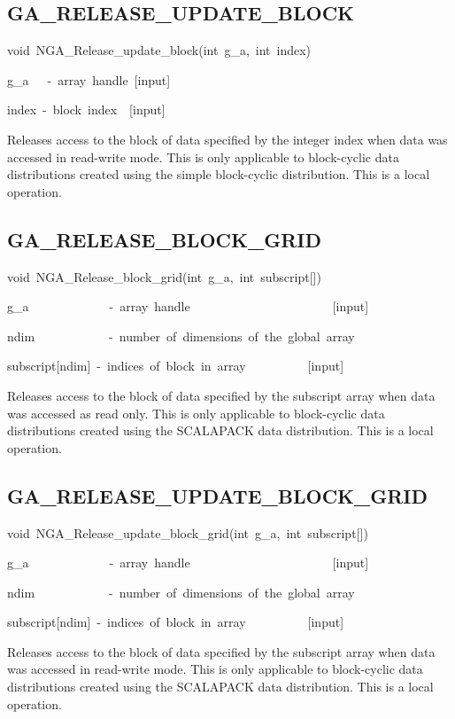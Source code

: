 \subsection*{\label{sub:GA_RELEASE_UPDATE_BLOCK}GA\_RELEASE\_UPDATE\_BLOCK}
\begin{lyxcode}
void~NGA\_Release\_update\_block(int~g\_a,~int~index)



g\_a~~~-~array~handle~{[}input{]}~

index~-~block~index~~{[}input{]}
\end{lyxcode}
Releases access to the block of data specified by the integer index
when data was accessed in read-write mode. This is only applicable
to block-cyclic data distributions created using the simple block-cyclic
distribution. This is a local operation. 


\subsection*{\label{sub:GA_RELEASE_BLOCK_GRID}GA\_RELEASE\_BLOCK\_GRID}
\begin{lyxcode}
void~NGA\_Release\_block\_grid(int~g\_a,~int~subscript{[}{]})



g\_a~~~~~~~~~~~~~-~array~handle~~~~~~~~~~~~~~~~~~~~~~~{[}input{]}~

ndim~~~~~~~~~~~~-~number~of~dimensions~of~the~global~array~

subscript{[}ndim{]}~-~indices~of~block~in~array~~~~~~~~~~{[}input{]}
\end{lyxcode}
Releases access to the block of data specified by the subscript array
when data was accessed as read only. This is only applicable to block-cyclic
data distributions created using the SCALAPACK data distribution.
This is a local operation. 


\subsection*{\label{sub:GA_RELEASE_UPDATE_BLOCK_GRID}GA\_RELEASE\_UPDATE\_BLOCK\_GRID}
\begin{lyxcode}
void~NGA\_Release\_update\_block\_grid(int~g\_a,~int~subscript{[}{]})



g\_a~~~~~~~~~~~~~-~array~handle~~~~~~~~~~~~~~~~~~~~~~~{[}input{]}

ndim~~~~~~~~~~~~-~number~of~dimensions~of~the~global~array

subscript{[}ndim{]}~-~indices~of~block~in~array~~~~~~~~~~{[}input{]}
\end{lyxcode}
Releases access to the block of data specified by the subscript array
when data was accessed in read-write mode. This is only applicable
to block-cyclic data distributions created using the SCALAPACK data
distribution. This is a local operation. 


